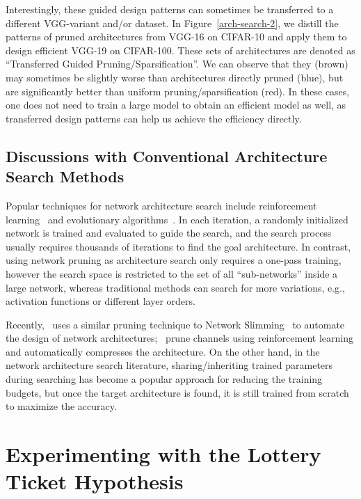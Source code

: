 Interestingly, these guided design patterns can sometimes be transferred to a different VGG-variant and/or dataset. In Figure~\ref{arch-search-2}, we distill the patterns of pruned architectures from VGG-16 on CIFAR-10 and apply them to design efficient VGG-19 on CIFAR-100. These sets of architectures are denoted as ``Transferred Guided Pruning/Sparsification''. We can observe that they (brown) may sometimes be slightly worse than architectures directly pruned (blue), but are significantly better than uniform pruning/sparsification (red). In these cases, one does not need to train a large model  to obtain an efficient model as well, as transferred design patterns can help us achieve the efficiency directly. 


\subsection{Discussions with Conventional Architecture Search Methods} 
Popular techniques for network architecture search include reinforcement learning~\cite{rl1, rl2} and evolutionary algorithms~\cite{genetic,liu2017hierarchical}. In each iteration, a randomly initialized network is trained and evaluated to guide the search, and the search process usually requires thousands of iterations to find the goal architecture. In contrast, using network pruning as architecture search  only requires a one-pass training, however the search space is restricted to the set of all ``sub-networks'' inside a large network, whereas traditional methods can search for more variations, e.g., activation functions or different layer orders.

Recently,~\cite{gordon2018morphnet} uses a similar pruning technique to Network Slimming~\cite{liu2017learning} to automate the design of network architectures;~\cite{amc} prune channels using reinforcement learning and automatically compresses the architecture. On the other hand, in the network architecture search literature, sharing/inheriting trained parameters~\cite{sharing,darts} during searching has become a popular approach for  reducing the training budgets, but once the target architecture is found, it is still trained from scratch to maximize the accuracy. 

\section{Experimenting with the Lottery Ticket Hypothesis}
\label{ap:lottery}

